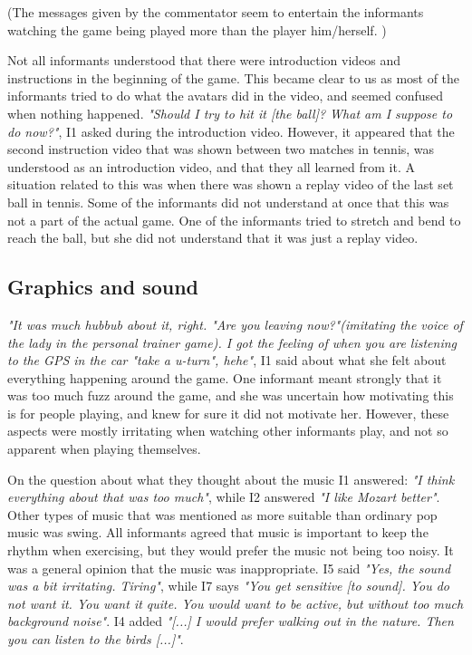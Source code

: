 (The messages given by the commentator seem to entertain the informants watching the game being played more than the player him/herself. )

Not all informants understood that there were introduction videos and instructions in the beginning of the game. This became clear to us as most of the informants tried to do what the avatars did in the video, and seemed confused when nothing happened. \emph{"Should I try to hit it [the ball]? What am I suppose to do now?"}, I1 asked during the introduction video. However, it appeared that the second instruction video that was shown between two matches in tennis, was understood as an introduction video, and that they all learned from it. A situation related to this was when there was shown a replay video of the last set ball in tennis. Some of the informants did not understand at once that this was not a part of the actual game. One of the informants tried to stretch and bend to reach the ball, but she did not understand that it was just a replay video. 

\subsection{Graphics and sound}
\emph{"It was much hubbub about it, right. "Are you leaving now?"(imitating the voice of the lady in the personal trainer game). I got the feeling of when you are listening to the GPS in the car "take a u-turn", hehe"}, I1 said about what she felt about everything happening around the game. One informant meant strongly that it was too much fuzz around the game, and she was uncertain how motivating this is for people playing, and knew for sure it did not motivate her. However, these aspects were mostly irritating when watching other informants play, and not so apparent when playing themselves. 

On the question about what they thought about the music I1 answered: \emph{"I think everything about that was too much"}, while I2 answered \emph{"I like Mozart better"}. Other types of music that was mentioned as more suitable than ordinary pop music was swing. All informants agreed that music is important to keep the rhythm when exercising, but they would prefer the music not being too noisy. It was a general opinion that the music was inappropriate.  I5 said \emph{"Yes, the sound was a bit irritating. Tiring"}, while I7 says \emph{"You get sensitive [to sound]. You do not want it. You want it quite. You would want to be active, but without too much background noise"}. I4 added \emph{"[...] I would prefer walking out in the nature. Then you can listen to the birds [...]"}.

